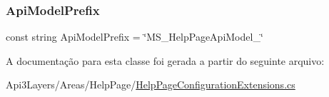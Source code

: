 \subsubsection{\texorpdfstring{Api\+Model\+Prefix}{ApiModelPrefix}}
{\footnotesize\ttfamily const string Api\+Model\+Prefix = \char`\"{}M\+S\+\_\+\+Help\+Page\+Api\+Model\+\_\+\char`\"{}\hspace{0.3cm}{\ttfamily [private]}}



A documentação para esta classe foi gerada a partir do seguinte arquivo\+:\begin{DoxyCompactItemize}
\item 
Api3\+Layers/\+Areas/\+Help\+Page/\hyperlink{HelpPageConfigurationExtensions_8cs}{Help\+Page\+Configuration\+Extensions.\+cs}\end{DoxyCompactItemize}
